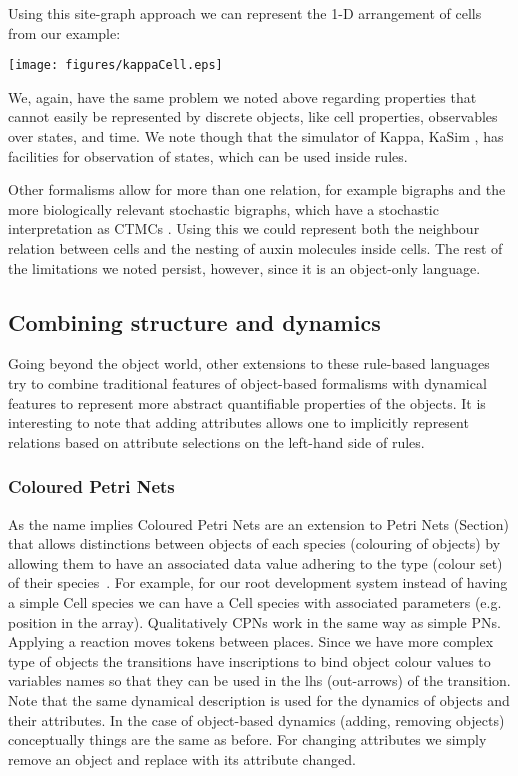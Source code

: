 \documentclass[phd]{infthesis}
\newcommand{\eg}{e.g.\xspace}
\begin{document}
Using this site-graph approach we can represent the 1-D arrangement of cells from
our example:
\begin{center}
    \texttt{[image: figures/kappaCell.eps]}
\end{center}
We, again, have the same problem we noted above regarding properties that cannot
easily be represented by discrete objects, like cell properties, observables
over states, and time. We note though that the simulator of Kappa, KaSim
\citep{KaSimManual2014}, has facilities for observation of states, which can
be used inside rules.

Other formalisms allow for more than one relation, for example bigraphs
\citep{milner1999communicating} and the more biologically relevant stochastic
bigraphs, which have a stochastic interpretation as CTMCs
\citep{krivine_stochastic_2008}. Using this we could represent both the
neighbour relation between cells and the nesting of auxin molecules inside
cells. The rest of the limitations we noted persist, however, since it is an
object-only language.

\subsection{Combining structure and dynamics}
\label{subsec:structDynLangs}
Going beyond the object world, other extensions to these rule-based languages
try to combine traditional features of object-based formalisms with dynamical
features to represent more abstract quantifiable properties of the objects.
It is interesting to note that adding attributes allows one to implicitly represent
relations based on attribute selections on the left-hand side of rules.

\subsubsection*{Coloured Petri Nets}
As the name implies Coloured Petri Nets are an extension to Petri Nets (Section)
that allows distinctions between objects of each species (colouring of objects)
by allowing them to have an associated data value adhering to the type (colour
set) of their species~\citep{jensen_coloured_1987}. For example, for our root
development system instead of having a simple $\mathrm{Cell}$ species we can
have a $\mathrm{Cell}$ species with associated parameters (\eg position in the
array). Qualitatively CPNs work in the same way as simple PNs. Applying a
reaction moves tokens between places. Since we have more complex type of objects
the transitions have inscriptions to bind object colour values to variables
names so that they can be used in the lhs (out-arrows) of the transition. Note
that the same dynamical description is used for the dynamics of objects and
their attributes. In the case of object-based dynamics (adding, removing
objects) conceptually things are the same as before. For changing attributes we
simply remove an object and replace with its attribute changed.
\end{document}
